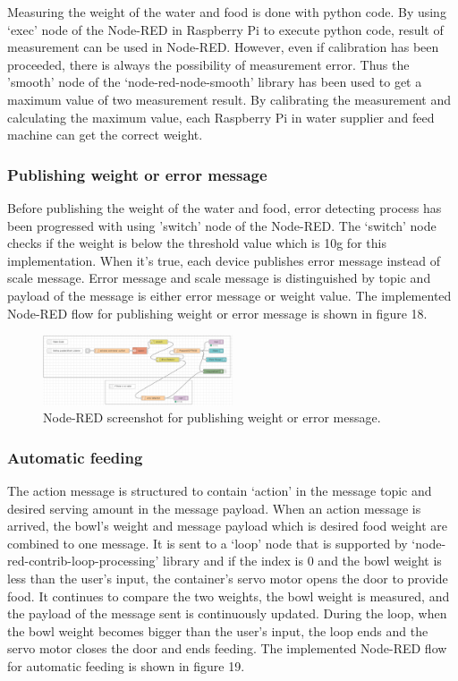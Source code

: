 \documentclass[conference]{IEEEtran}
\begin{document}
Measuring the weight of the water and food is done with python code. By using ‘exec’ node of the Node-RED in Raspberry Pi to execute python code, result of measurement can be used in Node-RED. However, even if calibration has been proceeded, there is always the possibility of measurement error. Thus the ’smooth’ node of the ‘node-red-node-smooth’ library has been used to get a maximum value of two measurement result. By calibrating the measurement and calculating the maximum value, each Raspberry Pi in water supplier and feed machine can get the correct weight.

\subsubsection{Publishing weight or error message}
Before publishing the weight of the water and food, error detecting process has been progressed with using ’switch’ node of the Node-RED. The ‘switch’ node checks if the weight is below the threshold value which is 10g for this implementation. When it’s true, each device publishes error message instead of scale message. Error message and scale message is distinguished by topic and payload of the message is either error message or weight value. The implemented Node-RED flow for publishing weight or error message is shown in figure 18.

\begin{figure}[htbp]
\centerline{\includegraphics[width=0.5\textwidth]{./images/Water Supplier Error Detection.png}}
\caption{Node-RED screenshot for publishing weight or error message.}
\label{fig}
\end{figure}

\subsubsection{Automatic feeding}
The action message is structured to contain ‘action’ in the message topic and desired serving amount in the message payload. When an action message is arrived, the bowl’s weight and message payload which is desired food weight are combined to one message. It is sent to a ‘loop’ node that is supported by ‘node-red-contrib-loop-processing’ library and if the index is 0 and the bowl weight is less than the user’s input, the container’s servo motor opens the door to provide food. It continues to compare the two weights, the bowl weight is measured, and the payload of the message sent is continuously updated. During the loop, when the bowl weight becomes bigger than the user’s input, the loop ends and the servo motor closes the door and ends feeding. The implemented Node-RED flow for automatic feeding is shown in figure 19.
\end{document}
